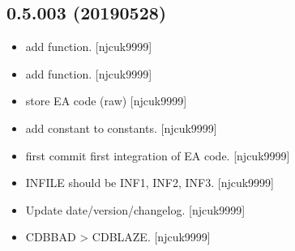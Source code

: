 \documentclass[a4paper,10pt,english]{report}
\begin{document}
\subsection{0.5.003 (2019\sphinxhyphen{}05\sphinxhyphen{}28)}
\label{\detokenize{misc/changelog:id152}}\begin{itemize}
\item {} 
 \sphinxhyphen{} add  function. {[}njcuk9999{]}

\item {} 
 \sphinxhyphen{} add  function. {[}njcuk9999{]}

\item {} 
 \sphinxhyphen{} store EA  code (raw) {[}njcuk9999{]}

\item {} 
 \sphinxhyphen{} add  constant to constants.
{[}njcuk9999{]}

\item {} 
 \sphinxhyphen{} first commit \sphinxhyphen{} first integration of EA
code. {[}njcuk9999{]}

\item {} 
 \sphinxhyphen{} INFILE should be INF1, INF2, INF3. {[}njcuk9999{]}

\item {} 
Update date/version/changelog. {[}njcuk9999{]}

\item {} 
 \sphinxhyphen{} CDBBAD \textendash{}\textgreater{} CDBLAZE. {[}njcuk9999{]}

\end{itemize}
\end{document}
